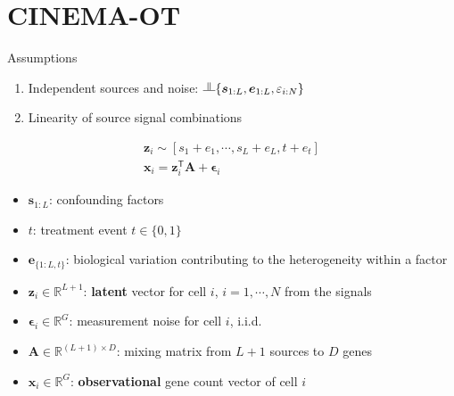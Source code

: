 \documentclass[10pt]{beamer}
\begin{document}
\section{CINEMA-OT}
\begin{frame}{Assumptions}
    \begin{enumerate}
        \item Independent sources and noise: $\vperp \{\bm{s}_{1:L},\bm{e}_{1:L},\epsilon_{i:N}\}$
        \item Linearity of source signal combinations%
    \end{enumerate}
    \begin{gather}
        \bm{z}_i{\sim}[s_1 + e_1 , \cdots , s_L + e_L , t + e_t]\\
        \bm{x}_i = \bm{z}_i^\mathsf{T}\mathbf{A} + \bm{\epsilon}_i
    \end{gather}
    \begin{itemize}\small
        \item $\bm{s}_{1:L}$: confounding factors
        \item $t$: treatment event $t\in\{0,1\}$
        \item $\bm{e}_{\{1:L,t\}}$: biological variation contributing to the heterogeneity within a factor
        \item $\bm{z}_i\in\mathbb{R}^{L+1}$: \textbf{latent} vector for cell $i$, $i=1,\cdots, N$ from the signals
        \item $\bm{\epsilon}_i\in\mathbb{R}^G$: measurement noise for cell $i$, i.i.d.
        \item $\mathbf{A}\in\mathbb{R}^{(L+1)\times D}$: mixing matrix from $L+1$ sources to $D$ genes
        \item $\bm{x}_i\in\mathbb{R}^{G}$: \textbf{observational} gene count vector of cell $i$
    \end{itemize}
\end{frame}

\end{document}
